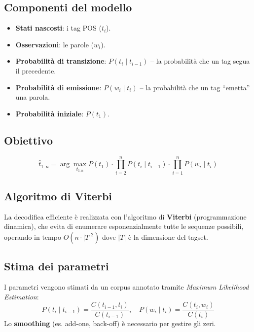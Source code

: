\documentclass[12pt,a4paper]{article}
\begin{document}
\subsection{Componenti del modello}
\begin{defbox}
\begin{itemize}[leftmargin=1.5em]
  \item \textbf{Stati nascosti}: i tag POS ($t_i$).
  \item \textbf{Osservazioni}: le parole ($w_i$).
  \item \textbf{Probabilità di transizione}: $P(t_i \mid t_{i-1})$ -- la probabilità che un tag segua il precedente.
  \item \textbf{Probabilità di emissione}: $P(w_i \mid t_i)$ -- la probabilità che un tag ``emetta'' una parola.
  \item \textbf{Probabilità iniziale}: $P(t_1)$.
\end{itemize}
\end{defbox}

\subsection{Obiettivo}
\begin{formulabox}
\[
\hat{t}_{1:n} = \arg\max_{t_{1:n}} P(t_1) \cdot \prod_{i=2}^{n} P(t_i \mid t_{i-1}) \cdot \prod_{i=1}^{n} P(w_i \mid t_i)
\]
\end{formulabox}

\subsection{Algoritmo di Viterbi}
La decodifica efficiente è realizzata con l'algoritmo di \textbf{Viterbi} (programmazione dinamica), che evita di enumerare esponenzialmente tutte le sequenze possibili, operando in tempo $O(n \cdot |T|^2)$ dove $|T|$ è la dimensione del tagset.

\subsection{Stima dei parametri}
I parametri vengono stimati da un corpus annotato tramite \emph{Maximum Likelihood Estimation}:
\[
P(t_i \mid t_{i-1}) = \frac{C(t_{i-1}, t_i)}{C(t_{i-1})}, \quad P(w_i \mid t_i) = \frac{C(t_i, w_i)}{C(t_i)}
\]
Lo \textbf{smoothing} (es. add-one, back-off) è necessario per gestire gli zeri.

\end{document}
